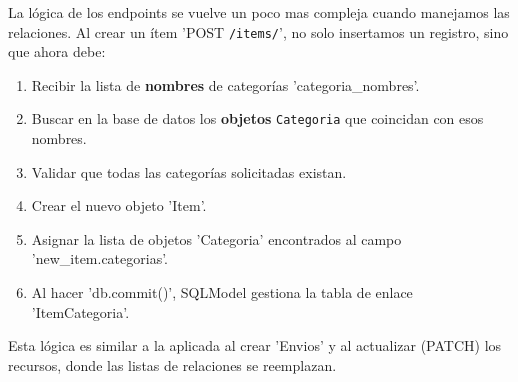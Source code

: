 \documentclass[12pt]{article}
\begin{document}
La lógica de los endpoints se vuelve un poco mas compleja cuando manejamos las relaciones. Al crear un ítem 'POST \texttt{/items/}', no solo insertamos un registro, sino que ahora debe:
\begin{enumerate}
    \item Recibir la lista de \textbf{nombres} de categorías 'categoria\_nombres'.
    \item Buscar en la base de datos los \textbf{objetos} \texttt{Categoria} que coincidan con esos nombres.
    \item Validar que todas las categorías solicitadas existan.
    \item Crear el nuevo objeto 'Item'.
    \item Asignar la lista de objetos 'Categoria' encontrados al campo 'new\_item.categorias'.
    \item Al hacer 'db.commit()', SQLModel gestiona la tabla de enlace 'ItemCategoria'.
\end{enumerate}
Esta lógica es similar a la aplicada al crear 'Envios' y al actualizar (PATCH) los recursos, donde las listas de relaciones se reemplazan.
\end{document}
